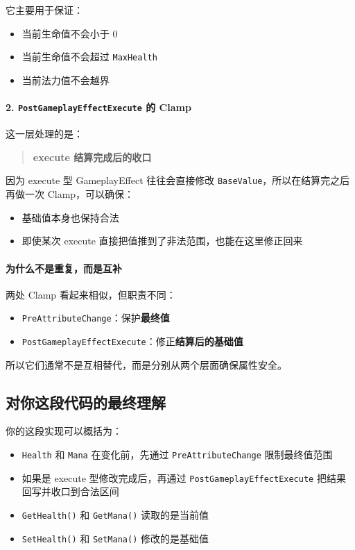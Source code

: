 它主要用于保证：

\begin{itemize}
	\item 当前生命值不会小于 0
	\item 当前生命值不会超过 \texttt{MaxHealth}
	\item 当前法力值不会越界
\end{itemize}

\paragraph{2. \texttt{PostGameplayEffectExecute} 的 Clamp}
这一层处理的是：

\begin{quote}
	\textbf{execute 结算完成后的收口}
\end{quote}

因为 execute 型 GameplayEffect 往往会直接修改 \texttt{BaseValue}，所以在结算完之后再做一次 Clamp，可以确保：

\begin{itemize}
	\item 基础值本身也保持合法
	\item 即使某次 execute 直接把值推到了非法范围，也能在这里修正回来
\end{itemize}

\paragraph{为什么不是重复，而是互补}
两处 Clamp 看起来相似，但职责不同：

\begin{itemize}
	\item \texttt{PreAttributeChange}：保护\textbf{最终值}
	\item \texttt{PostGameplayEffectExecute}：修正\textbf{结算后的基础值}
\end{itemize}

所以它们通常不是互相替代，而是分别从两个层面确保属性安全。

\subsection{对你这段代码的最终理解}

你的这段实现可以概括为：

\begin{itemize}
	\item \texttt{Health} 和 \texttt{Mana} 在变化前，先通过 \texttt{PreAttributeChange} 限制最终值范围
	\item 如果是 execute 型修改完成后，再通过 \texttt{PostGameplayEffectExecute} 把结果回写并收口到合法区间
	\item \texttt{GetHealth()} 和 \texttt{GetMana()} 读取的是当前值
	\item \texttt{SetHealth()} 和 \texttt{SetMana()} 修改的是基础值
\end{itemize}

